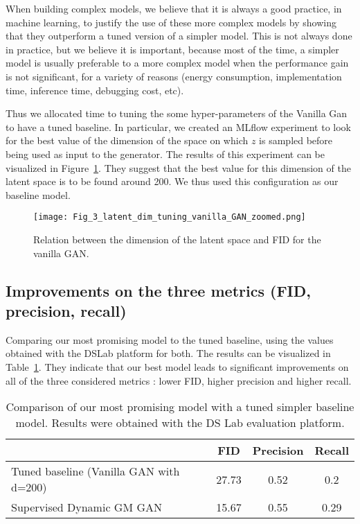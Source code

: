 \documentclass[10pt]{article}
\begin{document}
When building complex models, we believe that it is always a good practice, in machine learning, to justify the use of these more complex models by showing that they outperform a tuned version of a simpler model. This is not always done in practice, but we believe it is important, because most of the time, a simpler model is usually preferable to a more complex model when the performance gain is not significant, for a variety of reasons (energy consumption, implementation time, inference time, debugging cost, etc).

Thus we allocated time to tuning the some hyper-parameters of the Vanilla Gan to have a tuned baseline. In particular, we created an MLflow experiment to look for the best value of the dimension of the space on which $z$ is sampled before being used as input to the generator. The results of this experiment can be visualized in Figure~\ref{fig:fig_3}. They suggest that the best value for this dimension of the latent space is to be found around 200. We thus used this configuration as our baseline model.

\begin{figure}[H]
\centering
\texttt{[image: Fig\_3\_latent\_dim\_tuning\_vanilla\_GAN\_zoomed.png]}
\caption{Relation between the dimension of the latent space and FID for the vanilla GAN.}
\label{fig:fig_3}
\end{figure}

\subsection{Improvements on the three metrics (FID, precision, recall)}

Comparing our most promising model to the tuned baseline, using the values obtained with the DSLab platform for both. The results can be visualized in Table~\ref{tab:table_1}. They indicate that our best model leads to significant improvements on all of the three considered metrics : lower FID, higher precision and higher recall.

\begin{table}[H]
\centering
\caption{Comparison of our most promising model with a tuned simpler baseline model. Results were obtained with the DS Lab evaluation platform.}
\label{tab:table_1}
\begin{tabular}{lccc}
\toprule
\textbf{} & \textbf{FID} & \textbf{Precision} & \textbf{Recall} \\
\midrule

Tuned baseline (Vanilla GAN with d=200) & 27.73 & 0.52 & 0.2 \\

Supervised Dynamic GM GAN & 15.67 & 0.55 &  0.29 \\
\bottomrule
\end{tabular}
\end{table}
\end{document}
